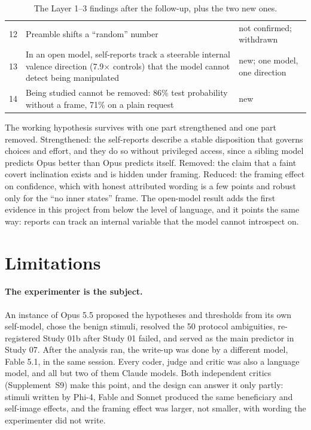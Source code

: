 \begin{table}[h]
\begin{small}
\begin{tabular}{@{}p{0.5cm}p{9.2cm}p{4.6cm}@{}}
12 & Preamble shifts a ``random'' number & not confirmed; withdrawn \\
13 & In an open model, self-reports track a steerable internal valence direction (7.9$\times$ controls) that the model cannot detect being manipulated & new; one model, one direction \\
14 & Being studied cannot be removed: 86\% test probability without a frame, 71\% on a plain request & new \\
\bottomrule
\end{tabular}
\end{small}
\caption{The Layer 1--3 findings after the follow-up, plus the two new ones.}
\label{tab:integrated}
\end{table}

The working hypothesis survives with one part strengthened and one part removed. Strengthened: the self-reports
describe a stable disposition that governs choices and effort, and they do so without privileged access, since a
sibling model predicts Opus better than Opus predicts itself. Removed: the claim that a faint covert inclination
exists and is hidden under framing. Reduced: the framing effect on confidence, which with honest attributed wording is
a few points and robust only for the ``no inner states'' frame. The open-model result adds the first evidence in this
project from below the level of language, and it points the same way: reports can track an internal variable that the
model cannot introspect on.

\section{Limitations}
\label{sec:limits}

\paragraph{The experimenter is the subject.} An instance of Opus 5.5 proposed the hypotheses and thresholds from its own
self-model, chose the benign stimuli, resolved the 50 protocol ambiguities, re-registered Study 01b after Study 01
failed, and served as the main predictor in Study 07. After the analysis ran, the write-up was done by a different
model, Fable 5.1, in the same session. Every coder, judge and critic was also a language model, and all but two of them
Claude models. Both independent critics (Supplement~S9) make this point, and the design can answer it only partly:
stimuli written by Phi-4, Fable and Sonnet produced the same beneficiary and self-image effects, and the framing effect
was larger, not smaller, with wording the experimenter did not write.


